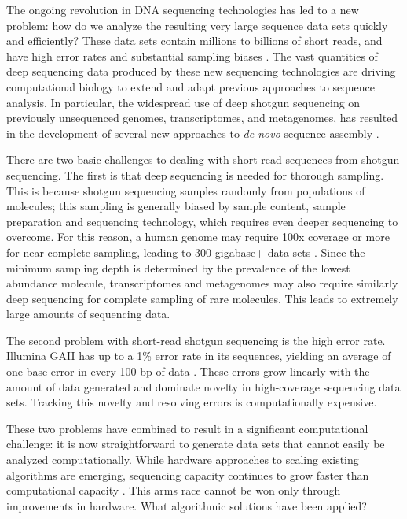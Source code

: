 \documentclass[10pt]{article}
\begin{document}
The ongoing revolution in DNA sequencing technologies has led to a new
problem: how do we analyze the resulting very large sequence data sets
quickly and efficiently? These data sets contain millions to billions
of short reads, and have high error rates and substantial sampling
biases \cite{pubmed19997069}.  The vast quantities of deep sequencing data produced by
these new sequencing technologies are driving
computational biology to extend and adapt previous approaches to sequence
analysis.  In
particular, the widespread use of deep shotgun sequencing on
previously unsequenced genomes, transcriptomes, and metagenomes, has
resulted in the development of several new approaches to {\em de novo}
sequence assembly \cite{pubmed20211242}.

There are two basic challenges to dealing with short-read sequences
from shotgun sequencing. The first is that deep sequencing is needed
for thorough sampling. This is because shotgun sequencing samples
randomly from populations of molecules; this sampling is
generally biased by sample content,
sample preparation and sequencing technology, which requires even deeper
sequencing to overcome.  For this reason, a
human genome may require 100x coverage or more for near-complete
sampling, leading to 300 gigabase+ data sets \cite{pubmed21187386}.  Since the minimum sampling depth
is determined by the prevalence of the lowest abundance molecule, transcriptomes and
metagenomes may also require similarly deep sequencing for complete
sampling of rare molecules. This leads to extremely large amounts of
sequencing data.

The second problem with short-read shotgun sequencing is the high
error rate.  Illumina GAII has up to a 1\% error rate in its
sequences, yielding an average of one base error in every 100 bp of
data \cite{pubmed19997069}.  These errors grow linearly with the amount of data generated and
dominate novelty in high-coverage sequencing data sets.  Tracking this
novelty and resolving errors is computationally expensive.

These two problems have combined to result in a significant
computational challenge: it is now straightforward to generate data
sets that cannot easily be analyzed computationally.  While hardware approaches
to scaling existing algorithms are emerging, sequencing capacity
continues to grow faster than computational capacity \cite{pubmed20441614}.
This arms race cannot be won only through improvements
in hardware.  What algorithmic solutions have been applied?
\end{document}
